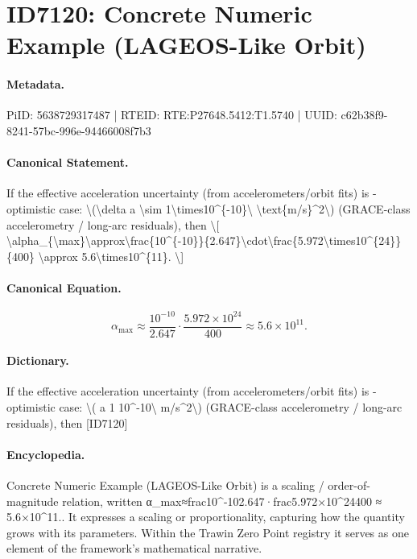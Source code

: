 \section*{ID7120: Concrete Numeric Example (LAGEOS-Like Orbit)}
\paragraph{Metadata.}
PiID: 5638729317487 | RTEID: RTE:P27648.5412:T1.5740 | UUID: c62b38f9-8241-57bc-996e-94466008f7b3

\paragraph{Canonical Statement.}
If the effective acceleration uncertainty (from accelerometers/orbit fits) is - optimistic case: \textbackslash{}(\textbackslash{}delta a \textbackslash{}sim 1\textbackslash{}times10\textasciicircum{}\{-10\}\textbackslash{} \textbackslash{}text\{m/s\}\textasciicircum{}2\textbackslash{}) (GRACE-class accelerometry / long-arc residuals), then \textbackslash{}[ \textbackslash{}alpha\_\{\textbackslash{}max\}\textbackslash{}approx\textbackslash{}frac\{10\textasciicircum{}\{-10\}\}\{2.647\}\textbackslash{}cdot\textbackslash{}frac\{5.972\textbackslash{}times10\textasciicircum{}\{24\}\}\{400\} \textbackslash{}approx 5.6\textbackslash{}times10\textasciicircum{}\{11\}. \textbackslash{}]

\paragraph{Canonical Equation.}
\[
\alpha_{\max}\approx\frac{10^{-10}}{2.647}\cdot\frac{5.972\times10^{24}}{400} \approx 5.6\times10^{11}.
\]

\paragraph{Dictionary.}
If the effective acceleration uncertainty (from accelerometers/orbit fits) is - optimistic case: \textbackslash{}( a 1 10\textasciicircum{}-10\textbackslash{} m/s\textasciicircum{}2\textbackslash{}) (GRACE-class accelerometry / long-arc residuals), then [ID7120]

\paragraph{Encyclopedia.}
Concrete Numeric Example (LAGEOS-Like Orbit) is a scaling / order-of-magnitude relation, written α\_max≈frac10\textasciicircum{}-102.647·frac5.972×10\textasciicircum{}24400 ≈ 5.6×10\textasciicircum{}11.. It expresses a scaling or proportionality, capturing how the quantity grows with its parameters. Within the Trawin Zero Point registry it serves as one element of the framework's mathematical narrative.
